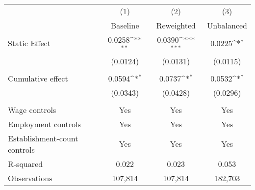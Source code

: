 {
\def\sym#1{\ifmmode^{#1}\else\(^{#1}\)\fi}
\begin{tabular}{l*{3}{c}}
\hline\hline
          &\multicolumn{1}{c}{(1)}&\multicolumn{1}{c}{(2)}&\multicolumn{1}{c}{(3)}\\
          &\multicolumn{1}{c}{Baseline}&\multicolumn{1}{c}{Reweighted}&\multicolumn{1}{c}{Unbalanced}\\
\hline
Static Effect&   0.0258\sym{**} &   0.0390\sym{***}&   0.0225\sym{*}  \\
          & (0.0124)         & (0.0131)         & (0.0115)         \\
\hline
\vspace{-1mm}&                  &                  &                  \\
Cumulative effect&0.0594\sym{*}         &0.0737\sym{*}         &0.0532\sym{*}         \\
          & (0.0343)         & (0.0428)         & (0.0296)         \\
\hline    &                  &                  &                  \\
Wage controls&      Yes         &      Yes         &      Yes         \\
Employment controls&      Yes         &      Yes         &      Yes         \\
Establishment-count controls&      Yes         &      Yes         &      Yes         \\
R-squared &    0.022         &    0.023         &    0.053         \\
Observations&  107,814         &  107,814         &  182,703         \\
\hline\hline
\end{tabular}
}
